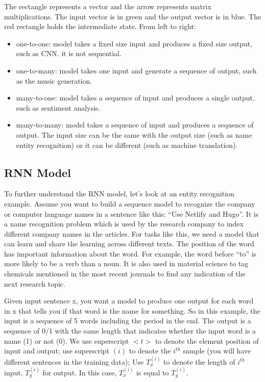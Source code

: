 \documentclass[12pt,]{krantz}
\providecommand{\tightlist}{%
  \setlength{\itemsep}{0pt}\setlength{\parskip}{0pt}}
\begin{document}
The rectangle represents a vector and the arrow represents matrix multiplications. The input vector is in green and the output vector is in blue. The red rectangle holds the intermediate state. From left to right:

\begin{itemize}
\tightlist
\item
  one-to-one: model takes a fixed size input and produces a fixed size output, such as CNN. it is not sequential.
\item
  one-to-many: model takes one input and generate a sequence of output, such as the music generation.
\item
  many-to-one: model takes a sequence of input and produces a single output, such as sentiment analysis.
\item
  many-to-many: model takes a sequence of input and produces a sequence of output. The input size can be the same with the output size (such as name entity recognition) or it can be different (such as machine translation).
\end{itemize}

\hypertarget{rnn-model}{%
\subsection{RNN Model}\label{rnn-model}}

To further understand the RNN model, let's look at an entity recognition example. Assume you want to build a sequence model to recognize the company or computer language names in a sentence like this: ``Use Netlify and Hugo''. It is a name recognition problem which is used by the research company to index different company names in the articles. For tasks like this, we need a model that can learn and share the learning across different texts. The position of the word has important information about the word. For example, the word before ``to'' is more likely to be a verb than a noun. It is also used in material science to tag chemicals mentioned in the most recent journals to find any indication of the next research topic.

Given input sentence x, you want a model to produce one output for each word in x that tells you if that word is the name for something. So in this example, the input is a sequence of 5 words including the period in the end. The output is a sequence of 0/1 with the same length that indicates whether the input word is a name (1) or not (0). We use superscript \(<t>\) to denote the element position of input and output; use superscript \((i)\) to denote the \(i^{th}\) sample (you will have different sentences in the training data); Use \(T_x^{(i)}\) to denote the length of \(i^{th}\) input, \(T_y^{(i)}\) for output. In this case, \(T_x^{(i)}\) is equal to \(T_y^{(i)}\).
\end{document}
